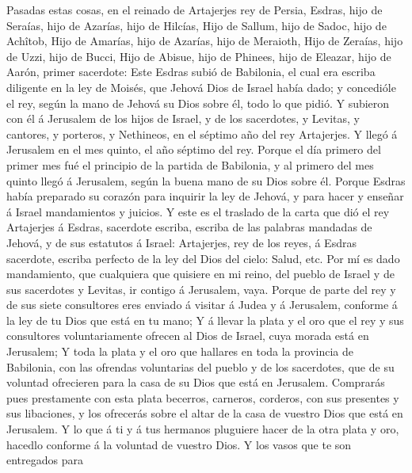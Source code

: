  Pasadas estas cosas, en el reinado de Artajerjes rey de
Persia, Esdras, hijo de Seraías, hijo de Azarías, hijo de Hilcías,
 Hijo de Sallum, hijo de Sadoc, hijo de Achîtob,
 Hijo de Amarías, hijo de Azarías, hijo de Meraioth,
 Hijo de Zeraías, hijo de Uzzi, hijo de Bucci,
 Hijo de Abisue, hijo de Phinees, hijo de Eleazar, hijo de
Aarón, primer sacerdote:  Este Esdras subió de Babilonia,
el cual era escriba diligente en la ley de Moisés, que Jehová Dios de
Israel había dado; y concedióle el rey, según la mano de Jehová su Dios
sobre él, todo lo que pidió.  Y subieron con él á
Jerusalem de los hijos de Israel, y de los sacerdotes, y Levitas, y
cantores, y porteros, y Nethineos, en el séptimo año del rey Artajerjes.
 Y llegó á Jerusalem en el mes quinto, el año séptimo del
rey.  Porque el día primero del primer mes fué el
principio de la partida de Babilonia, y al primero del mes quinto llegó
á Jerusalem, según la buena mano de su Dios sobre él. 
Porque Esdras había preparado su corazón para inquirir la ley de Jehová,
y para hacer y enseñar á Israel mandamientos y juicios. 
Y este es el traslado de la carta que dió el rey Artajerjes á Esdras,
sacerdote escriba, escriba de las palabras mandadas de Jehová, y de sus
estatutos á Israel:  Artajerjes, rey de los reyes, á
Esdras sacerdote, escriba perfecto de la ley del Dios del cielo: Salud,
etc.  Por mí es dado mandamiento, que cualquiera que
quisiere en mi reino, del pueblo de Israel y de sus sacerdotes y
Levitas, ir contigo á Jerusalem, vaya.  Porque de parte
del rey y de sus siete consultores eres enviado á visitar á Judea y á
Jerusalem, conforme á la ley de tu Dios que está en tu mano;
 Y á llevar la plata y el oro que el rey y sus
consultores voluntariamente ofrecen al Dios de Israel, cuya morada está
en Jerusalem;  Y toda la plata y el oro que hallares en
toda la provincia de Babilonia, con las ofrendas voluntarias del pueblo
y de los sacerdotes, que de su voluntad ofrecieren para la casa de su
Dios que está en Jerusalem.  Comprarás pues prestamente
con esta plata becerros, carneros, corderos, con sus presentes y sus
libaciones, y los ofrecerás sobre el altar de la casa de vuestro Dios
que está en Jerusalem.  Y lo que á ti y á tus hermanos
pluguiere hacer de la otra plata y oro, hacedlo conforme á la voluntad
de vuestro Dios.  Y los vasos que te son entregados para

